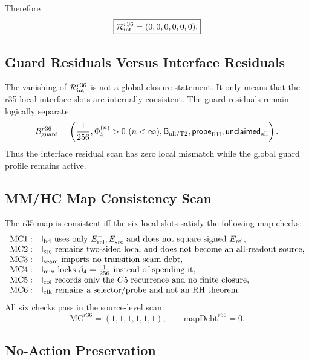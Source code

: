 Therefore
\[
\boxed{
\mathcal R_{\rm int}^{r36}=(0,0,0,0,0,0).
}
\]

\subsection{Guard Residuals Versus Interface Residuals}
\label{subsec:r36-guard-versus-interface-residuals}

The vanishing of \(\mathcal R_{\rm int}^{r36}\) is not a global closure
statement.  It only means that the r35 local interface slots are internally
consistent.  The guard residuals remain logically separate:
\[
\mathcal B_{\rm guard}^{r36}
=
\left(
{1\over256},
\Phi_5^{(n)}>0\ (n<\infty),
\mathsf B_{\rm all/T2},
\mathsf{probe}_{\rm RH},
\mathsf{unclaimed}_{\rm all}
\right).
\]
Thus the interface residual scan has zero local mismatch while the global guard
profile remains active.

\subsection{MM/HC Map Consistency Scan}
\label{subsec:r36-mmhc-map-consistency-scan}

The r35 map is consistent iff the six local slots satisfy the following map
checks:
\[
\begin{array}{ll}
\mathrm{MC1}:&\mathsf I_{\rm bd}\hbox{ uses only }E_{\rm rel}^{-},E_{\rm src}^{-}
\hbox{ and does not square signed }E_{\rm rel},\\
\mathrm{MC2}:&\mathsf I_{\rm src}\hbox{ remains two-sided local and does not become an all-readout source},\\
\mathrm{MC3}:&\mathsf I_{\rm seam}\hbox{ imports no transition seam debt},\\
\mathrm{MC4}:&\mathsf I_{\rm mix}\hbox{ locks }\beta_4={1\over256}\hbox{ instead of spending it},\\
\mathrm{MC5}:&\mathsf I_{\rm col}\hbox{ records only the }C5\hbox{ recurrence and no finite closure},\\
\mathrm{MC6}:&\mathsf I_{\rm clk}\hbox{ remains a selector/probe and not an RH theorem}.
\end{array}
\]
All six checks pass in the source-level scan:
\[
\boxed{
\mathrm{MC}^{r36}=(1,1,1,1,1,1),
\qquad
\mathrm{mapDebt}^{r36}=0.
}
\]

\subsection{No-Action Preservation}
\label{subsec:r36-no-action-preservation}

